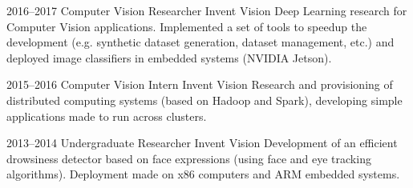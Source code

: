 \documentclass[a4paper]{cv-friggeri-x}
\begin{document}
\begin{entrylist}

\entry
    {2016--2017}
    {Computer Vision Researcher}%
    {Invent Vision}
    {Deep Learning research for Computer Vision applications. Implemented a set of tools to speedup the development (e.g. synthetic dataset generation, dataset management, etc.) and deployed image classifiers in embedded systems (NVIDIA Jetson).}

\entry
    {2015--2016}
    {Computer Vision Intern}
    {Invent Vision}
    {Research and provisioning of distributed computing systems (based on Hadoop and Spark), developing simple applications made to run across clusters.}

\entry
    {2013--2014}
    {Undergraduate Researcher}
    {Invent Vision}
    {Development of an efficient drowsiness detector based on face expressions (using face and eye tracking algorithms). Deployment made on x86 computers and ARM embedded systems.}



\end{entrylist}


\end{document}
